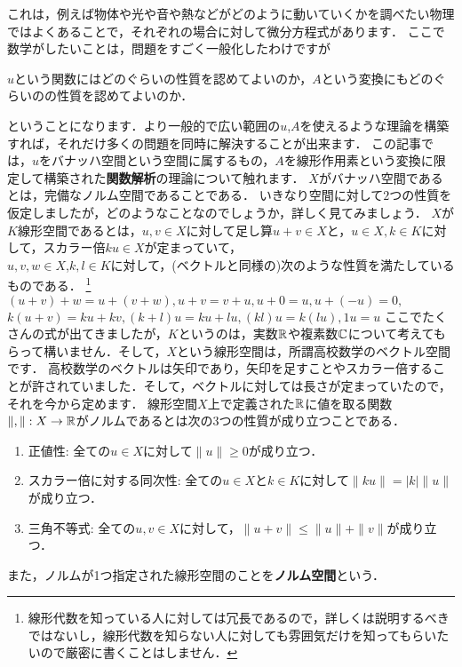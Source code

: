 これは，例えば物体や光や音や熱などがどのように動いていくかを調べたい物理ではよくあることで，それぞれの場合に対して微分方程式があります．
ここで数学がしたいことは，問題をすごく一般化したわけですが
\begin{center}
$u$という関数にはどのぐらいの性質を認めてよいのか，$A$という変換にもどのぐらいのの性質を認めてよいのか．
\end{center}
ということになります．より一般的で広い範囲の$u$,$A$を使えるような理論を構築すれば，それだけ多くの問題を同時に解決することが出来ます．
この記事では，$u$をバナッハ空間という空間に属するもの，$A$を線形作用素という変換に限定して構築された\textbf{関数解析}の理論について触れます．
$X$がバナッハ空間であるとは，完備なノルム空間であることである．
いきなり空間に対して$2$つの性質を仮定しましたが，どのようなことなのでしょうか，詳しく見てみましょう．
$X$が$K$線形空間であるとは，$u,v \in X$に対して足し算$u+v \in X$と，$u \in X, k \in K$に対して，スカラー倍$ku \in X$が定まっていて，\\
$u,v,w \in X$,$k,l \in K$に対して，(ベクトルと同様の)次のような性質を満たしているものである．
\footnote{線形代数を知っている人に対しては冗長であるので，詳しくは説明するべきではないし，線形代数を知らない人に対しても雰囲気だけを知ってもらいたいので厳密に書くことはしません．}\\
$ (u + v ) + w = u + (v + w) , u + v = v + u , u + 0 = u, u + (-u) = 0 ,$\\
$ k(u + v) = ku + kv , (k+l)u= ku + lu ,(kl)u = k(lu), 1u = u$
ここでたくさんの式が出てきましたが，$K$というのは，実数$\mathbb R$や複素数$\mathbb C$について考えてもらって構いません．そして，$X$という線形空間は，所謂高校数学のベクトル空間です．
高校数学のベクトルは矢印であり，矢印を足すことやスカラー倍することが許されていました．そして，ベクトルに対しては長さが定まっていたので，それを今から定めます．
線形空間$X$上で定義された$\mathbb R$に値を取る関数$\| , \| : X \to \mathbb R$がノルムであるとは次の$3$つの性質が成り立つことである．
\begin{enumerate}
\item 正値性: 全ての$u \in X$に対して$\| u \| \ge 0$が成り立つ．
\item スカラー倍に対する同次性: 全ての$u \in X$と$k \in K$に対して$\| ku \| = |k| \| u\|$が成り立つ．
\item 三角不等式: 全ての$u,v \in X$に対して，$\|u+v \| \le \|u \| + \| v \|$が成り立つ．
\end{enumerate}
また，ノルムが1つ指定された線形空間のことを\textbf{ノルム空間}という．
